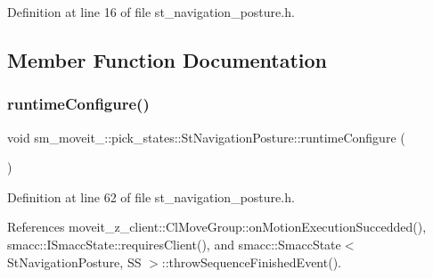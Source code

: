 Definition at line 16 of file st\+\_\+navigation\+\_\+posture.\+h.



\subsection{Member Function Documentation}
\mbox{\label{structsm__moveit__2_1_1pick__states_1_1StNavigationPosture_a0cec0d8766ab498b7a1f588c79e09e7a}} 
\subsubsection{\texorpdfstring{runtime\+Configure()}{runtimeConfigure()}}
{\footnotesize\ttfamily void sm\+\_\+moveit\+\_\+::pick\+\_\+states\+::\+St\+Navigation\+Posture\+::runtime\+Configure (\begin{DoxyParamCaption}{ }\end{DoxyParamCaption})\hspace{0.3cm}{\ttfamily [inline]}}



Definition at line 62 of file st\+\_\+navigation\+\_\+posture.\+h.



References moveit\+\_\+z\+\_\+client\+::\+Cl\+Move\+Group\+::on\+Motion\+Execution\+Succedded(), smacc\+::\+I\+Smacc\+State\+::requires\+Client(), and smacc\+::\+Smacc\+State$<$ St\+Navigation\+Posture, S\+S $>$\+::throw\+Sequence\+Finished\+Event().


